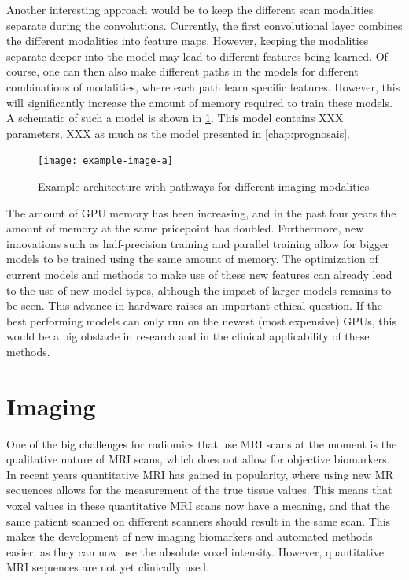 Another interesting approach would be to keep the different scan modalities separate during the convolutions.
Currently, the first convolutional layer combines the different modalities into feature maps.
However, keeping the modalities separate deeper into the model may lead to different features being learned.
Of course, one can then also make different paths in the models for different combinations of modalities, where each path learn specific features.
However, this will significantly increase the amount of memory required to train these models.
A schematic of such a model is shown in \cref{fig:discussion_architecture}.
This model contains XXX parameters, XXX as much as the model presented in \cref{chap:prognosais}.

\begin{figure}
\texttt{[image: example-image-a]}
\caption{Example architecture with pathways for different imaging modalities}\label{fig:discussion_architecture}
\end{figure}

The amount of GPU memory has been increasing, and in the past four years the amount of memory at the same pricepoint has doubled.
Furthermore, new innovations such as half-precision training and parallel training allow for bigger models to be trained using the same amount of memory.
The optimization of current models and methods to make use of these new features can already lead to the use of new model types, although the impact of larger models remains to be seen.
This advance in hardware raises an important ethical question.
If the best performing models can only run on the newest (most expensive) GPUs, this would be a big obstacle in research and in the clinical applicability of these methods.

\section{Imaging}

One of the big challenges for radiomics that use \gls{MRI} scans at the moment is the qualitative nature of \gls{MRI} scans, which does not allow for objective biomarkers.
In recent years quantitative \gls{MRI} has gained in popularity, where using new \gls{MR} sequences allows for the measurement of the true tissue values.
This means that voxel values in these quantitative \gls{MRI} scans now have a meaning, and that the same patient scanned on different scanners should result in the same scan.
This makes the development of new imaging biomarkers and automated methods easier, as they can now use the absolute voxel intensity.
However, quantitative \gls{MRI} sequences are not yet clinically used.

